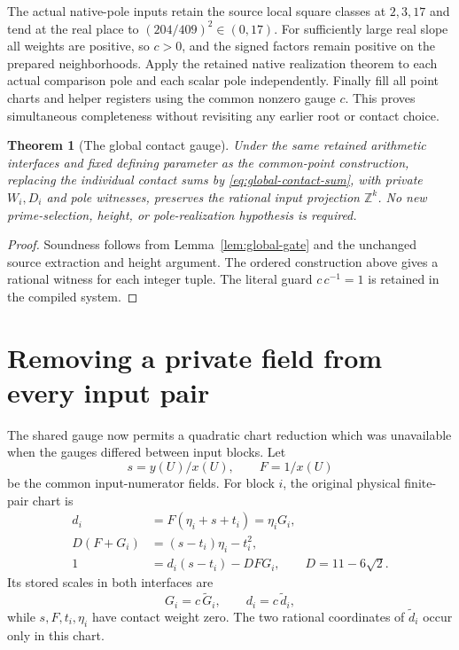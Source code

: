 \documentclass[11pt]{article}
\newtheorem{theorem}{Theorem}
\begin{document}
The actual native-pole inputs retain the
source local square classes at \(2,3,17\)
and tend at the real place to
\((204/409)^2\in(0,17)\). For sufficiently
large real slope all weights are positive,
so \(c>0\), and the signed factors remain
positive on the prepared neighborhoods.
Apply the retained native realization
theorem to each actual comparison pole
and each scalar pole independently.
Finally fill all point charts and helper
registers using the common nonzero
gauge \(c\). This proves simultaneous
completeness without revisiting any
earlier root or contact choice.

\begin{theorem}[The global contact gauge]
\label{thm:global-gauge}
Under the same retained arithmetic
interfaces and fixed defining parameter
as the common-point construction, replacing
the individual contact sums by
\eqref{eq:global-contact-sum}, with private
\(W_i,D_i\) and pole witnesses, preserves
the rational input projection
\(\mathbb Z^k\). No new prime-selection,
height, or pole-realization hypothesis
is required.
\end{theorem}
\begin{proof}
Soundness follows from
Lemma~\ref{lem:global-gate} and the
unchanged source extraction and height
argument. The ordered construction above
gives a rational witness for each integer
tuple. The literal guard \(c\,c^{-1}=1\)
is retained in the compiled system.
\end{proof}

\section{Removing a private field from every input pair}
\label{sec:global-input-pair}

The shared gauge now permits a quadratic
chart reduction which was unavailable
when the gauges differed between input
blocks. Let
\[
      s=y(U)/x(U),\qquad F=1/x(U)
\]
be the common input-numerator fields.
For block \(i\), the original physical
finite-pair chart is
\[
\begin{split}
 d_i&=F(\eta_i+s+t_i)=\eta_iG_i,\\
 D(F+G_i)&=(s-t_i)\eta_i-t_i^2,\\
 1&=d_i(s-t_i)-DFG_i,
                         \qquad D=11-6\sqrt2 .
\end{split}
\]
Its stored scales in both interfaces are
\[
             G_i=c\,\widetilde G_i,\qquad
             d_i=c\,\widetilde d_i,
\]
while \(s,F,t_i,\eta_i\) have contact
weight zero. The two rational coordinates
of \(\widetilde d_i\) occur only in this
chart.
\end{document}
